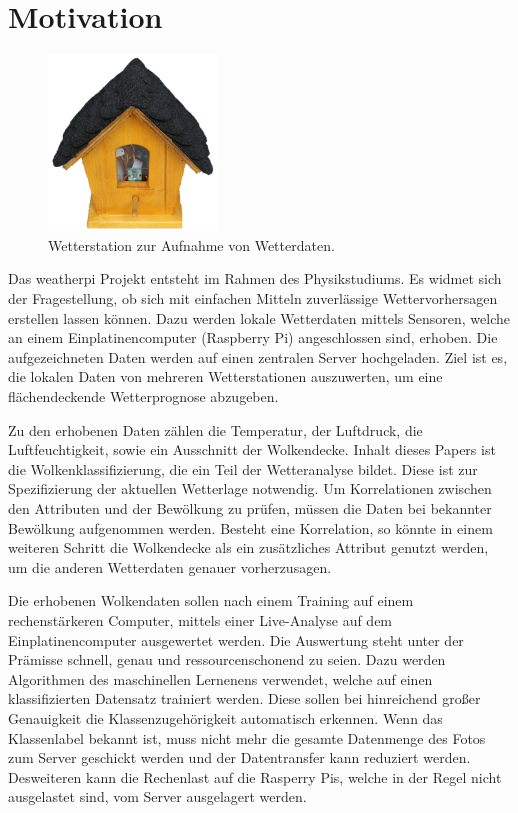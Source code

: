 \section{Motivation}
\label{sec:Motivation}

\begin{figure}
		\vspace{-0.9cm}
		\centering
		\includegraphics[width=0.4\textwidth]{./pictures/wetterstation.pdf}
		\caption{Wetterstation zur Aufnahme von Wetterdaten.}
		\label{fig:name}
		\vspace{-0.5cm}
\end{figure}
Das weatherpi Projekt entsteht im Rahmen des Physikstudiums.
Es widmet sich der Fragestellung, ob sich mit einfachen Mitteln zuverlässige
Wettervorhersagen erstellen lassen können.
Dazu werden lokale Wetterdaten mittels Sensoren, welche an einem 
Einplatinencomputer (Raspberry Pi) angeschlossen sind, erhoben.
Die aufgezeichneten Daten werden auf einen zentralen Server hochgeladen.
Ziel ist es, die lokalen Daten von mehreren Wetterstationen auszuwerten, um eine
flächendeckende Wetterprognose abzugeben. 

Zu den erhobenen Daten zählen die Temperatur, der Luftdruck, die Luftfeuchtigkeit,
sowie ein Ausschnitt der Wolkendecke.
Inhalt dieses Papers ist die Wolkenklassifizierung, die ein Teil der
Wetteranalyse bildet.
Diese ist zur Spezifizierung der aktuellen Wetterlage notwendig.
Um Korrelationen zwischen den Attributen und der Bewölkung zu prüfen,
müssen die Daten bei bekannter Bewölkung aufgenommen werden.
Besteht eine Korrelation, so könnte in einem weiteren Schritt die Wolkendecke
als ein zusätzliches Attribut genutzt werden, um die anderen Wetterdaten genauer
vorherzusagen. 

Die erhobenen Wolkendaten sollen nach einem Training auf einem rechenstärkeren
Computer, mittels einer Live-Analyse auf dem Einplatinencomputer ausgewertet 
werden.
Die Auswertung steht unter der Prämisse schnell, genau und ressourcenschonend 
zu seien.
Dazu werden Algorithmen des maschinellen Lernenens verwendet, welche auf einen
klassifizierten Datensatz trainiert werden. 
Diese sollen bei hinreichend großer Genauigkeit die Klassenzugehörigkeit
automatisch erkennen.
Wenn das Klassenlabel bekannt ist, muss nicht mehr die gesamte Datenmenge des
Fotos zum Server geschickt werden und der Datentransfer kann reduziert werden. 
Desweiteren kann die Rechenlast auf die Rasperry Pis, welche in der Regel 
nicht ausgelastet sind, vom Server ausgelagert werden. 

